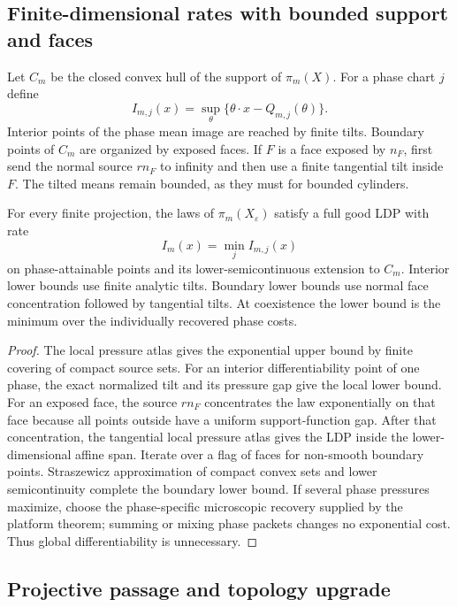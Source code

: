 \subsection{Finite-dimensional rates with bounded support and faces}

Let $C_m$ be the closed convex hull of the support of $\pi_m(X)$.  For a phase
chart $j$ define
\[
 I_{m,j}(x)=\sup_{\theta}\{\theta\cdot x-Q_{m,j}(\theta)\}.
\]
Interior points of the phase mean image are reached by finite tilts.  Boundary
points of $C_m$ are organized by exposed faces.  If $F$ is a face exposed by
$n_F$, first send the normal source $rn_F$ to infinity and then use a finite
tangential tilt inside $F$.  The tilted means remain bounded, as they must for
bounded cylinders.

\begin{theorem}
\label{thm:r7-d1-finite}
For every finite projection, the laws of $\pi_m(X_\varepsilon)$ satisfy a full
good LDP with rate
\[
 I_m(x)=\min_j I_{m,j}(x)
\]
on phase-attainable points and its lower-semicontinuous extension to $C_m$.
Interior lower bounds use finite analytic tilts.  Boundary lower bounds use
normal face concentration followed by tangential tilts.  At coexistence the
lower bound is the minimum over the individually recovered phase costs.
\end{theorem}

\begin{proof}
The local pressure atlas gives the exponential upper bound by finite covering
of compact source sets.  For an interior differentiability point of one phase,
the exact normalized tilt and its pressure gap give the local lower bound.  For
an exposed face, the source $rn_F$ concentrates the law exponentially on that
face because all points outside have a uniform support-function gap.  After
that concentration, the tangential local pressure atlas gives the LDP inside
the lower-dimensional affine span.  Iterate over a flag of faces for
non-smooth boundary points.  Straszewicz approximation of compact convex sets
and lower semicontinuity complete the boundary lower bound.  If several phase
pressures maximize, choose the phase-specific microscopic recovery supplied by
the platform theorem; summing or mixing phase packets changes no exponential
cost.  Thus global differentiability is unnecessary.
\end{proof}

\subsection{Projective passage and topology upgrade}

